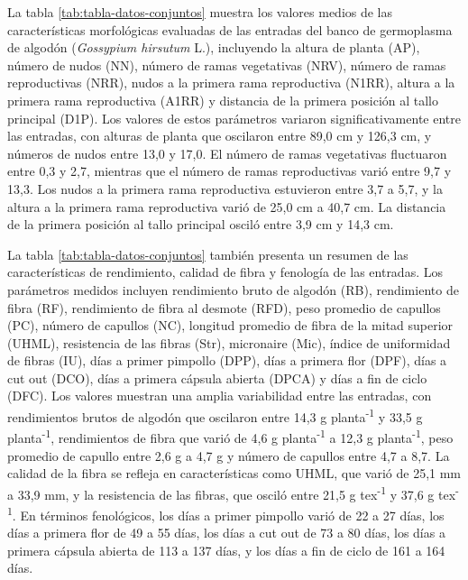 \documentclass[12pt,oneside]{reedthesis}
\begin{document}
La tabla \ref{tab:tabla-datos-conjuntos} muestra los valores medios de las características morfológicas evaluadas de las entradas del banco de germoplasma de algodón (\emph{Gossypium hirsutum} L.), incluyendo la altura de planta (AP), número de nudos (NN), número de ramas vegetativas (NRV), número de ramas reproductivas (NRR), nudos a la primera rama reproductiva (N1RR), altura a la primera rama reproductiva (A1RR) y distancia de la primera posición al tallo principal (D1P). Los valores de estos parámetros variaron significativamente entre las entradas, con alturas de planta que oscilaron entre 89,0 cm y 126,3 cm, y números de nudos entre 13,0 y 17,0. El número de ramas vegetativas fluctuaron entre 0,3 y 2,7, mientras que el número de ramas reproductivas varió entre 9,7 y 13,3. Los nudos a la primera rama reproductiva estuvieron entre 3,7 a 5,7, y la altura a la primera rama reproductiva varió de 25,0 cm a 40,7 cm. La distancia de la primera posición al tallo principal osciló entre 3,9 cm y 14,3 cm.

La tabla \ref{tab:tabla-datos-conjuntos} también presenta un resumen de las características de rendimiento, calidad de fibra y fenología de las entradas. Los parámetros medidos incluyen rendimiento bruto de algodón (RB), rendimiento de fibra (RF), rendimiento de fibra al desmote (RFD), peso promedio de capullos (PC), número de capullos (NC), longitud promedio de fibra de la mitad superior (UHML), resistencia de las fibras (Str), micronaire (Mic), índice de uniformidad de fibras (IU), días a primer pimpollo (DPP), días a primera flor (DPF), días a cut out (DCO), días a primera cápsula abierta (DPCA) y días a fin de ciclo (DFC). Los valores muestran una amplia variabilidad entre las entradas, con rendimientos brutos de algodón que oscilaron entre 14,3 g planta\textsuperscript{-1} y 33,5 g planta\textsuperscript{-1}, rendimientos de fibra que varió de 4,6 g planta\textsuperscript{-1} a 12,3 g planta\textsuperscript{-1}, peso promedio de capullo entre 2,6 g a 4,7 g y número de capullos entre 4,7 a 8,7. La calidad de la fibra se refleja en características como UHML, que varió de 25,1 mm a 33,9 mm, y la resistencia de las fibras, que osciló entre 21,5 g tex\textsuperscript{-1} y 37,6 g tex\textsuperscript{-1}. En términos fenológicos, los días a primer pimpollo varió de 22 a 27 días, los días a primera flor de 49 a 55 días, los días a cut out de 73 a 80 días, los días a primera cápsula abierta de 113 a 137 días, y los días a fin de ciclo de 161 a 164 días.
\end{document}
